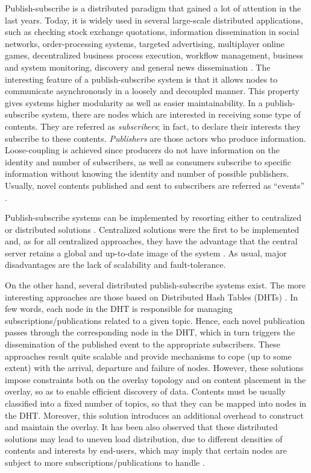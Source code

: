 \documentclass[10pt, conference, compsocconf]{IEEEtran}
\begin{document}
Publish-subscribe is a distributed paradigm that gained a lot of attention in the last years. Today, it is widely used in several large-scale distributed applications, such as checking stock exchange quotations, information dissemination in social networks, order-processing systems, targeted advertising, multiplayer online games, decentralized business process execution, workflow management, business and system monitoring, discovery and general news dissemination \cite{Cheung:2010}.
The interesting feature of a publish-subscribe system is that it allows nodes to communicate asynchronously in a loosely and decoupled manner. This property gives systems higher modularity as well as easier maintainability. 
In a publish-subscribe system, there are nodes which are interested in receiving some type of contents. They are referred as \textit{subscribers}; in fact, to declare their interests they subscribe to these contents. \textit{Publishers} are those actors who produce information. 
Loose-coupling is achieved since producers do not have information on the identity and number of subscribers, as well as consumers subscribe to specific information without knowing the identity and number of possible publishers. 
Usually, novel contents published and sent to subscribers are referred as ``events'' \cite{Ahullo:2008}. 

Publish-subscribe systems can be implemented by resorting either to centralized or distributed solutions \cite{Carzaniga:2000}. Centralized solutions were the first to be implemented and, as for all centralized approaches, they have the advantage that the central server retains a global and up-to-date image of the system \cite{Eugster:2003,Fabret:2001,TamAJ03}. 
As usual, major disadvantages are the lack of scalability and fault-tolerance. 

On the other hand, several distributed publish-subscribe systems exist. 
The more interesting approaches are those based on Distributed Hash Tables (DHTs) \cite{Baldoni:2005,Shvartzshnaider:2010,Stoica:2003}. 
In few words, each node in the DHT is responsible for managing subscriptions/publications related to a given topic. Hence, each novel publication passes through the corresponding node in the DHT, which in turn triggers the dissemination of the published event to the appropriate subscribers.
These approaches result quite scalable and provide mechanisms to cope (up to some extent) with the arrival, departure and failure of nodes. However, these solutions impose constraints both on the overlay topology and on content placement in the overlay, so as to enable efficient discovery of data.
Contents must be usually classified into a fixed number of topics, so that they can be mapped 
into nodes in the DHT.
Moreover, this solution introduces an additional overhead to construct and maintain the overlay.
It has been also observed that these distributed solutions may lead to uneven load distribution, due to different
densities of contents and interests by end-users, which may imply that certain nodes are subject to more subscriptions/publications to handle \cite{Cheung:2010}.
\end{document}
